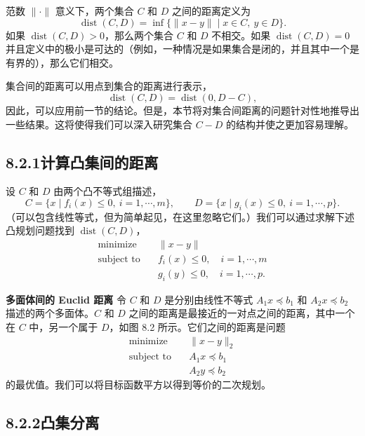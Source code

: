 \documentclass[UTF8,12pt,a4paper,fontset=fandol]{ctexart}
\begin{document}
范数 $\|\cdot\|$ 意义下，两个集合 $C$ 和 $D$ 之间的距离定义为
\[
\operatorname{dist}(C,D)=\inf\{\|x-y\|\mid x\in C,\ y\in D\}.
\]
如果 $\operatorname{dist}(C,D)>0$，那么两个集合 $C$ 和 $D$ 不相交。如果 $\operatorname{dist}(C,D)=0$ 并且定义中的极小是可达的（例如，一种情况是如果集合是闭的，并且其中一个是有界的），那么它们相交。

集合间的距离可以用点到集合的距离进行表示，
\[
\operatorname{dist}(C,D)=\operatorname{dist}(0,D-C),
\]
因此，可以应用前一节的结论。但是，本节将对集合间距离的问题针对性地推导出一些结果。这将使得我们可以深入研究集合 $C-D$ 的结构并使之更加容易理解。

\subsection*{8.2.1\quad 计算凸集间的距离}

设 $C$ 和 $D$ 由两个凸不等式组描述，
\[
C=\{x\mid f_i(x)\leq 0,\ i=1,\cdots,m\},\qquad
D=\{x\mid g_i(x)\leq 0,\ i=1,\cdots,p\}.
\]
（可以包含线性等式，但为简单起见，在这里忽略它们。）我们可以通过求解下述凸规划问题找到 $\operatorname{dist}(C,D)$，
\begin{equation}
\begin{aligned}
\text{minimize}\quad & \|x-y\|\\
\text{subject to}\quad & f_i(x)\leq 0,\quad i=1,\cdots,m\\
& g_i(y)\leq 0,\quad i=1,\cdots,p.
\end{aligned}
\tag{8.3}
\end{equation}

\noindent\textbf{多面体间的 Euclid 距离}\quad
令 $C$ 和 $D$ 是分别由线性不等式 $A_1x\preceq b_1$ 和 $A_2x\preceq b_2$ 描述的两个多面体。$C$ 和 $D$ 之间的距离是最接近的一对点之间的距离，其中一个在 $C$ 中，另一个属于 $D$，如图 8.2 所示。它们之间的距离是问题
\begin{equation}
\begin{aligned}
\text{minimize}\quad & \|x-y\|_2\\
\text{subject to}\quad & A_1x\preceq b_1\\
& A_2y\preceq b_2
\end{aligned}
\tag{8.4}
\end{equation}
的最优值。我们可以将目标函数平方以得到等价的二次规划。

\subsection*{8.2.2\quad 凸集分离}
\end{document}
